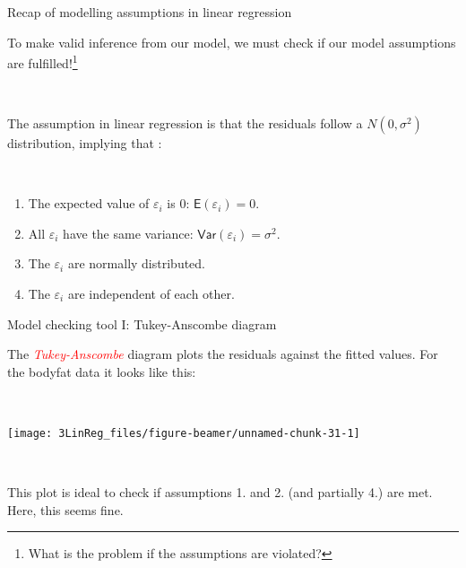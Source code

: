 \documentclass[
  10pt,
  ignorenonframetext,
]{beamer}
\begin{document}
\begin{frame}
\begin{block}{Recap of modelling assumptions in linear regression}
\protect\hypertarget{recap-of-modelling-assumptions-in-linear-regression}{}
\(~\)

To make valid inference from our model, we must check if our model
assumptions are
fulfilled!\footnote{What is the problem if the assumptions are violated?}

\(~\)

The assumption in linear regression is that the residuals follow a
\(N(0,\sigma^2)\) distribution, implying that :

\(~\)

\begin{enumerate}
\item
  The expected value of \(\varepsilon_i\) is 0:
  \(\mathsf{E}(\varepsilon_i)=0\). \vspace{1mm}
\item
  All \(\varepsilon_i\) have the same variance:
  \(\mathsf{Var}(\varepsilon_i)=\sigma^2\).\\
  \vspace{1mm}
\item
  The \(\varepsilon_i\) are normally distributed. \vspace{1mm}
\item
  The \(\varepsilon_i\) are independent of each other.
\end{enumerate}
\end{block}
\end{frame}

\begin{frame}
\begin{block}{Model checking tool I: Tukey-Anscombe diagram}
\protect\hypertarget{model-checking-tool-i-tukey-anscombe-diagram}{}
\(~\)

The \emph{\textcolor{red}{Tukey-Anscombe}} diagram plots the residuals
against the fitted values. For the bodyfat data it looks like this:

\(~\)

\begin{center}\texttt{[image: 3LinReg\_files/figure-beamer/unnamed-chunk-31-1]} \end{center}

\(~\)

This plot is ideal to check if assumptions 1. and 2. (and partially 4.)
are met. Here, this seems fine.
\end{block}
\end{frame}
\end{document}
